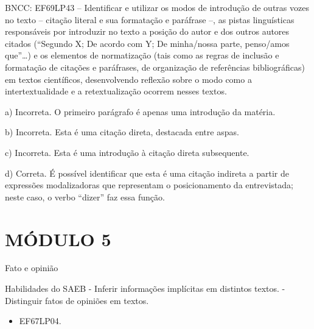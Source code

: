 {BNCC: EF69LP43 -- Identificar e utilizar os modos de introdução de
outras vozes no texto -- citação literal e sua formatação e paráfrase
--, as pistas linguísticas responsáveis por introduzir no texto a
posição do autor e dos outros autores citados (``Segundo X; De acordo
com Y; De minha/nossa parte, penso/amos que''\ldots) e os elementos de
normatização (tais como as regras de inclusão e formatação de citações e
paráfrases, de organização de referências bibliográficas) em textos
científicos, desenvolvendo reflexão sobre o modo como a
intertextualidade e a retextualização ocorrem nesses textos.

a) Incorreta. O primeiro parágrafo é apenas uma introdução da matéria.

b) Incorreta. Esta é uma citação direta, destacada entre aspas.

c) Incorreta. Esta é uma introdução à citação direta subsequente.

d) Correta. É possível identificar que esta é uma citação indireta a
partir de expressões modalizadoras que representam o posicionamento da
entrevistada; neste caso, o verbo ``dizer'' faz essa função.

\section{MÓDULO 5}

Fato e opinião

Habilidades do SAEB - Inferir informações implícitas em distintos
textos. - Distinguir fatos de opiniões em textos.


\begin{itemize}
\item EF67LP04.
\end{itemize}


}
